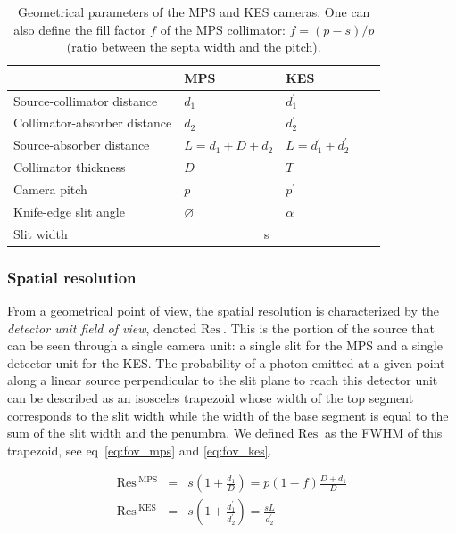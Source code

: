 \documentclass[a4paper,english]{article}
\begin{document}
\begin{table}[h]
\centering
\begin{tabular}{lllll}
	\midrule
																& MPS               & KES \\
	\midrule
	Source-collimator distance		& $d_1$             & $d_1^{'}$ \\
 	Collimator-absorber distance	& $d_2$             & $d_2^{'}$ \\
	Source-absorber distance			& $L=d_1+D+d_2$			& $L=d_1^{'}+d_2^{'}$\\
 	Collimator thickness 					& $D$               & $T$ \\
	Camera pitch									& $p$								& $p^{'}$\\
	Knife-edge slit angle					& $\varnothing$			& $\alpha$\\	
	\cline{2-3}
	Slit width										& \multicolumn{2}{c}{s} \\
	\midrule
\end{tabular}
\caption{Geometrical parameters of the MPS and KES cameras. One can also define the fill factor $f$ of the MPS collimator: $f=(p-s)/p$ (ratio between the septa width and the pitch).}
\label{table:CamerasParameters}
\end{table}



\subsubsection{Spatial resolution}

\newcommand\FOV{\textrm{Res}\,}
\newcommand\MPS{\textrm{MPS}}
\newcommand\KES{\textrm{KES}}
\newcommand\du{}
\newcommand\DE{\textrm{Eff}\,}

From a geometrical point of view, the spatial resolution is characterized by the
\textit{detector unit field of view}, denoted $\FOV_{\du}$. This is the portion of
the source that can be seen through a single camera unit: a single slit for the
MPS and a single detector unit for the KES. The probability of a photon emitted at a
given point along a linear source perpendicular to the slit plane to reach
this detector unit can be described as an isosceles trapezoid whose width of the top segment corresponds to the slit width while the width of the base segment is equal to the sum of the slit width and the penumbra. We defined $\FOV_{\du}$
as the FWHM of this trapezoid, see eq~\ref{eq:fov_mps} and \ref{eq:fov_kes}.

\begin{eqnarray}
  \label{eq:fov_mps}
  \FOV_{\du}^{\MPS} & = & s\left(1+ \frac{d_1}{D}\right) = p(1-f) \frac{D+d_1}{D} \\
  \label{eq:fov_kes}
   \FOV_{\du}^{\KES} & = & s\left(1+ \frac{d_1^{'}}{d_2^{'}}\right) = \frac{sL}{d_2^{'}}
\end{eqnarray}
\end{document}
